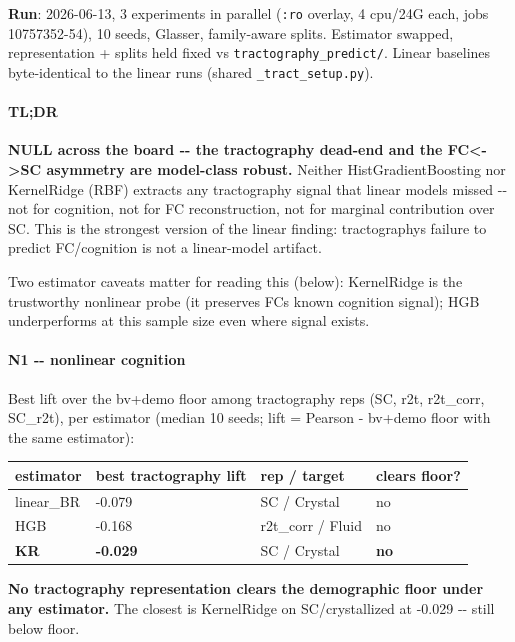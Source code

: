 \textbf{Run}: 2026-06-13, 3 experiments in parallel (\texttt{:ro} overlay, 4 cpu/24G each, jobs 10757352-54), 10 seeds, Glasser, family-aware splits. Estimator swapped, representation + splits held fixed vs \texttt{tractography\_predict/}. Linear baselines byte-identical to the linear runs (shared \texttt{\_tract\_setup.py}).

\paragraph{TL;DR}\label{tldr-4}

\textbf{NULL across the board -\/- the tractography dead-end and the FC\textless-\textgreater SC asymmetry are model-class robust.} Neither HistGradientBoosting nor KernelRidge (RBF) extracts any tractography signal that linear models missed -\/- not for cognition, not for FC reconstruction, not for marginal contribution over SC. This is the strongest version of the linear finding: tractography\textquotesingle s failure to predict FC/cognition is not a linear-model artifact.

Two estimator caveats matter for reading this (below): KernelRidge is the trustworthy nonlinear probe (it preserves FC\textquotesingle s known cognition signal); HGB underperforms at this sample size even where signal exists.

\paragraph{N1 -\/- nonlinear cognition}\label{n1----nonlinear-cognition}

Best lift over the bv+demo floor among tractography reps (SC, r2t, r2t\_corr, SC\_r2t), per estimator (median 10 seeds; lift = Pearson - bv+demo floor with the same estimator):

{\def\LTcaptype{none} %
\begin{longtable}[]{@{}llll@{}}
\toprule\noalign{}
estimator & best tractography lift & rep / target & clears floor? \\
\midrule\noalign{}
\endhead
\bottomrule\noalign{}
\endlastfoot
linear\_BR & -0.079 & SC / Crystal & no \\
HGB & -0.168 & r2t\_corr / Fluid & no \\
\textbf{KR} & \textbf{-0.029} & SC / Crystal & \textbf{no} \\
\end{longtable}
}

\textbf{No tractography representation clears the demographic floor under any estimator.} The closest is KernelRidge on SC/crystallized at -0.029 -\/- still below floor.

